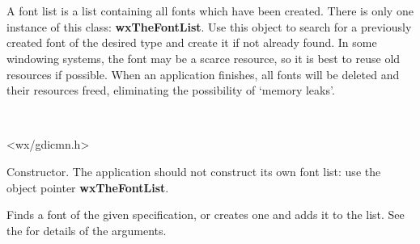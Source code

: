 \section{}\label{wxfontlist}

A font list is a list containing all fonts which have been created. There
is only one instance of this class: {\bf wxTheFontList}.  Use this object to search
for a previously created font of the desired type and create it if not already found.
In some windowing systems, the font may be a scarce resource, so it is best to
reuse old resources if possible.  When an application finishes, all fonts will be
deleted and their resources freed, eliminating the possibility of `memory leaks'.


\\


<wx/gdicmn.h>




\label{wxfontlistctor}


Constructor. The application should not construct its own font list:
use the object pointer {\bf wxTheFontList}.

\label{findorcreatefont}


Finds a font of the given specification, or creates one and adds it to the list. See the  for
details of the arguments.

